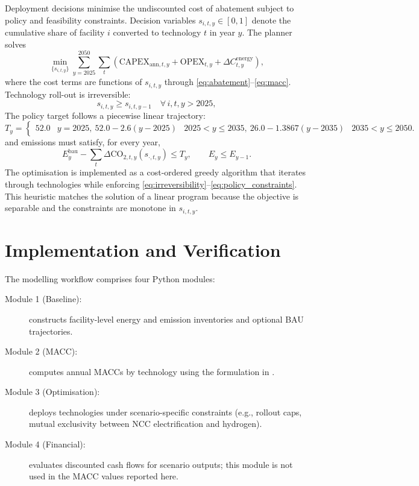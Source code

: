\documentclass[12pt,a4paper]{article}
\begin{document}
Deployment decisions minimise the undiscounted cost of abatement subject to policy and feasibility constraints. Decision variables $s_{i,t,y} \in [0,1]$ denote the cumulative share of facility $i$ converted to technology $t$ in year $y$. The planner solves
\begin{equation}
\min_{\{s_{i,t,y}\}} \sum_{y=2025}^{2050} \sum_{t} \left( \mathrm{CAPEX}_{\mathrm{ann},t,y} + \mathrm{OPEX}_{t,y} + \Delta C^{\mathrm{energy}}_{t,y} \right),
\label{eq:objective}
\end{equation}
where the cost terms are functions of $s_{i,t,y}$ through \eqref{eq:abatement}--\eqref{eq:macc}. Technology roll-out is irreversible:
\begin{equation}
s_{i,t,y} \ge s_{i,t,y-1} \quad \forall \, i,t,y>2025,
\label{eq:irreversibility}
\end{equation}
The policy target follows a piecewise linear trajectory:
\begin{equation}
T_y =
\begin{cases}
52.0 & y = 2025, \
52.0 - 2.6 (y-2025) & 2025 < y \le 2035, \
26.0 - 1.3867 (y-2035) & 2035 < y \le 2050.
\end{cases}
\label{eq:target_path}
\end{equation}
and emissions must satisfy, for every year,
\begin{equation}
E_y^{\mathrm{bau}} - \sum_{t} \Delta \mathrm{CO}_{2,t,y}(s_{\cdot,t,y}) \le T_y, \qquad E_y \le E_{y-1}.
\label{eq:policy_constraints}
\end{equation}
The optimisation is implemented as a cost-ordered greedy algorithm that iterates through technologies while enforcing \eqref{eq:irreversibility}--\eqref{eq:policy_constraints}. This heuristic matches the solution of a linear program because the objective is separable and the constraints are monotone in $s_{i,t,y}$.

\section{Implementation and Verification}
\label{sec:implementation}

The modelling workflow comprises four Python modules:
\begin{description}
    \item[Module 1 (Baseline):] constructs facility-level energy and emission inventories and optional BAU trajectories.
    \item[Module 2 (MACC):] computes annual MACCs by technology using the formulation in .
    \item[Module 3 (Optimisation):] deploys technologies under scenario-specific constraints (e.g., rollout caps, mutual exclusivity between NCC electrification and hydrogen).
    \item[Module 4 (Financial):] evaluates discounted cash flows for scenario outputs; this module is not used in the MACC values reported here.
\end{description}
\end{document}
